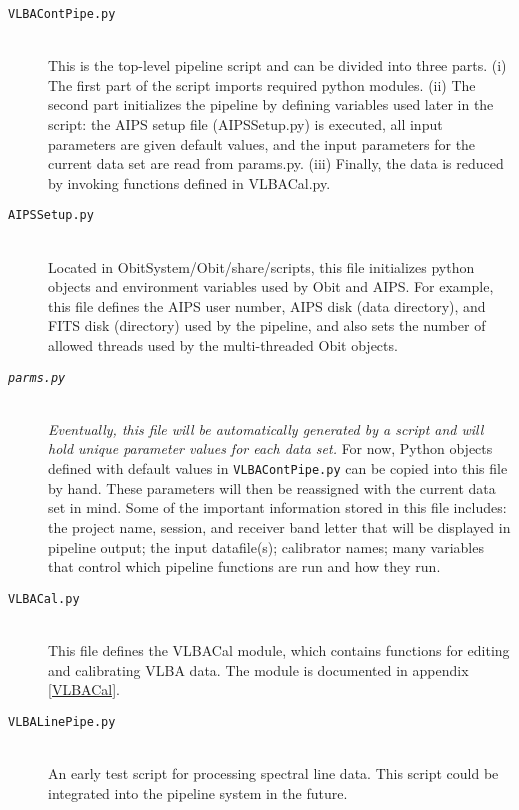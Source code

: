 \documentclass[10pt,onecolumn,final]{IEEEtran}
\begin{document}
\begin{description}
\item[\tt VLBAContPipe.py] \hfill \\ This is the top-level pipeline script and can be divided into three parts.  (i) The first part of the script imports required python modules.  (ii) The second part initializes the pipeline by defining variables used later in the script: the AIPS setup file (AIPSSetup.py) is executed, all input parameters are given default values, and the input parameters for the current data set are read from params.py.  (iii) Finally, the data is reduced by invoking functions defined in VLBACal.py.

\item[\tt AIPSSetup.py] \hfill \\ Located in ObitSystem/Obit/share/scripts, this file initializes python objects and environment variables used by Obit and AIPS.  For example, this file defines the AIPS user number, AIPS disk (data directory), and FITS disk (directory) used by the pipeline, and also sets the number of allowed threads used by the multi-threaded Obit objects.

\item[\tt \emph{parms.py}] \hfill \\ \emph{Eventually, this file will be automatically generated by a script and will hold unique parameter values for each data set.}  For now, Python objects defined with default values in {\tt VLBAContPipe.py} can be copied into this file by hand.  These parameters will then be reassigned with the current data set in mind.  Some of the important information stored in this file includes: the project name, session, and receiver band letter that will be displayed in pipeline output; the input datafile(s); calibrator names; many variables that control which pipeline functions are run and how they run.

\item[\tt VLBACal.py] \hfill \\ This file defines the VLBACal module, which contains functions for editing and calibrating VLBA data.  The module is documented in appendix \ref{VLBACal}.

\item[\tt VLBALinePipe.py] \hfill \\  An early test script for processing spectral line data.  This script could be integrated into the pipeline system in the future.
\end{description}
\end{document}
